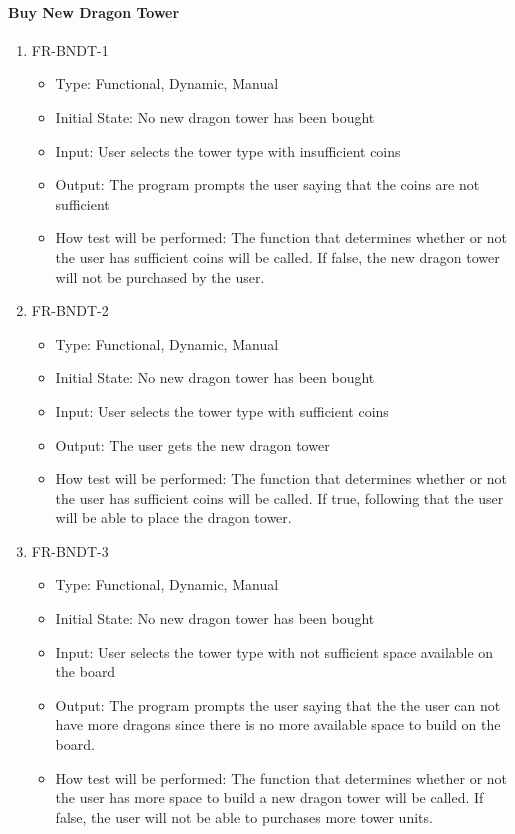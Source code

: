 \documentclass[12,english]{article}
\begin{document}
\paragraph{Buy New Dragon Tower}
\begin{enumerate}
  \item FR-BNDT-1
  \begin{itemize}
      \item Type: Functional, Dynamic, Manual
      \item Initial State: No new dragon tower has been bought
      \item Input: User selects the tower type with insufficient coins
      \item Output: The program prompts the user saying that the coins are not sufficient
      \item How test will be performed: The function that determines whether or not the user has sufficient coins will be called. If false, the new dragon tower will not be purchased by the user. 
  \end{itemize}
  \item FR-BNDT-2
  \begin{itemize}
      \item Type: Functional, Dynamic, Manual
      \item Initial State:  No new dragon tower has been bought
      \item Input: User selects the tower type with sufficient coins
      \item Output: The user gets the new dragon tower
      \item How test will be performed: The function that determines whether or not the user has sufficient coins will be called. If true, following that the user will be able to place the dragon tower. 
  \end{itemize}
  \item FR-BNDT-3
  \begin{itemize}
      \item Type: Functional, Dynamic, Manual
      \item Initial State: No new dragon tower has been bought
      \item Input: User selects the tower type with not sufficient space available on the board
      \item Output: The program prompts the user saying that the the user can not have more dragons since there is no more available space to build on the board. 
      \item How test will be performed: The function that determines whether or not the user has more space to build a new dragon tower will be called. If false,  the user will not be able to purchases more tower units. 
  \end{itemize}
\end{enumerate}
\end{document}
